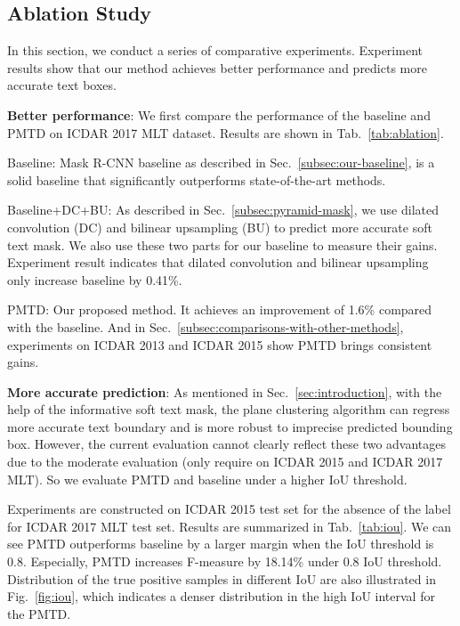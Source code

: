 \documentclass[10pt,twocolumn,letterpaper]{article}
\begin{document}
\subsection{Ablation Study}\label{subsec:ablation-study}

In this section, we conduct a series of comparative experiments. Experiment results show that our method achieves better performance and predicts more accurate text boxes.

\textbf{Better performance}: We first compare the performance of the baseline and PMTD on ICDAR 2017 MLT dataset. Results are shown in Tab.~\ref{tab:ablation}.

Baseline: Mask R-CNN baseline as described in Sec.~\ref{subsec:our-baseline}, is a solid baseline that significantly outperforms state-of-the-art methods.

Baseline+DC+BU: As described in Sec.~\ref{subsec:pyramid-mask}, we use dilated convolution (DC) and bilinear upsampling (BU) to predict more accurate soft text mask. We also use these two parts for our baseline to measure their gains. Experiment result indicates that dilated convolution and bilinear upsampling only increase baseline by 0.41\%.

PMTD: Our proposed method. It achieves an improvement of 1.6\% compared with the baseline. And in Sec.~\ref{subsec:comparisons-with-other-methods}, experiments on ICDAR 2013 and ICDAR 2015 show PMTD brings consistent gains.

\textbf{More accurate prediction}: As mentioned in Sec.~\ref{sec:introduction}, with the help of the informative soft text mask, the plane clustering algorithm can regress more accurate text boundary and is more robust to imprecise predicted bounding box. However, the current evaluation cannot clearly reflect these two advantages due to the moderate evaluation (only require  on ICDAR 2015 and ICDAR 2017 MLT). So we evaluate PMTD and baseline under a higher IoU threshold.

Experiments are constructed on ICDAR 2015 test set for the absence of the label for ICDAR 2017 MLT test set. Results are summarized in Tab.~\ref{tab:iou}. We can see PMTD outperforms baseline by a larger margin when the IoU threshold is 0.8. Especially, PMTD increases F-measure by 18.14\% under 0.8 IoU threshold. Distribution of the true positive samples in different IoU are also illustrated in Fig.~\ref{fig:iou}, which indicates a denser distribution in the high IoU interval for the PMTD.
\end{document}
